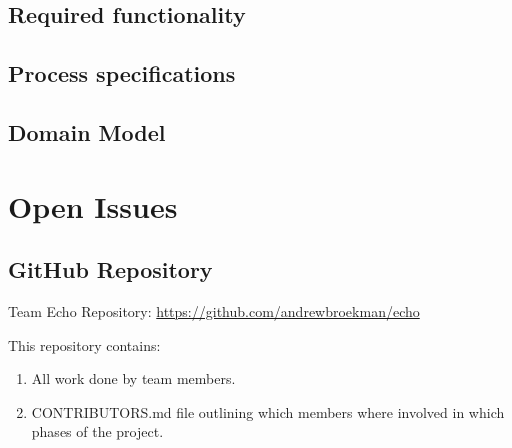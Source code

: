 \documentclass[a4paper,10pt]{article}
\begin{document}
\subsection{Required functionality}

\subsection{Process specifications}

\subsection{Domain Model}

\section{Open Issues}
\subsection {GitHub Repository}
Team Echo Repository: \url{https://github.com/andrewbroekman/echo}

This repository contains:
\begin{enumerate}
\item All work done by team members.
\item CONTRIBUTORS.md file outlining which members where involved in which phases of the project.
\end{enumerate}
\end{document}
